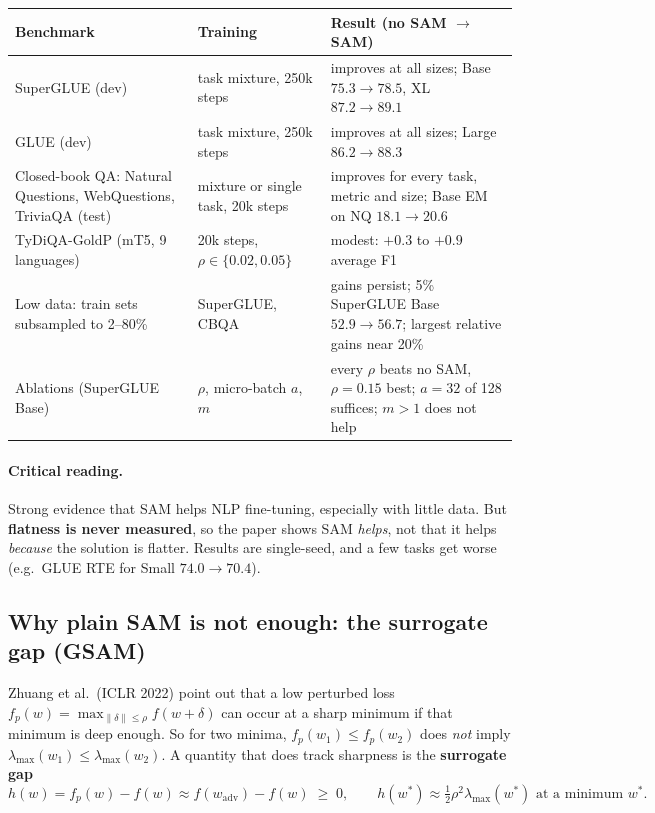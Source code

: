 \documentclass[11pt]{article}
\newcommand{\lmax}{\lambda_{\max}}
\theoremstyle{plain}
\begin{document}
\begin{center}\small
\begin{tabularx}{\textwidth}{@{}p{4.2cm}p{3.0cm}L@{}}
\toprule
\textbf{Benchmark} & \textbf{Training} & \textbf{Result (no SAM $\to$ SAM)} \\
\midrule
SuperGLUE (dev) & task mixture, 250k steps & improves at all sizes; Base $75.3\to78.5$, XL $87.2\to89.1$ \\
GLUE (dev) & task mixture, 250k steps & improves at all sizes; Large $86.2\to88.3$ \\
Closed-book QA: Natural Questions, WebQuestions, TriviaQA (test) & mixture or single task, 20k steps & improves for every task, metric and size; Base EM on NQ $18.1\to20.6$ \\
TyDiQA-GoldP (mT5, 9 languages) & 20k steps, $\rho \in \{0.02, 0.05\}$ & modest: $+0.3$ to $+0.9$ average F1 \\
Low data: train sets subsampled to 2--80\% & SuperGLUE, CBQA & gains persist; 5\% SuperGLUE Base $52.9\to56.7$; largest relative gains near 20\% \\
Ablations (SuperGLUE Base) & $\rho$, micro-batch $a$, $m$ & every $\rho$ beats no SAM, $\rho{=}0.15$ best; $a = 32$ of 128 suffices; $m>1$ does not help \\
\bottomrule
\end{tabularx}
\end{center}

\paragraph{Critical reading.} Strong evidence that SAM helps NLP fine-tuning, especially with little data. But \textbf{flatness is never measured},
so the paper shows SAM \emph{helps}, not that it helps \emph{because} the solution is flatter. Results are single-seed, and a few tasks get worse
(e.g.\ GLUE RTE for Small $74.0\to70.4$).

\subsection{Why plain SAM is not enough: the surrogate gap (GSAM)}

Zhuang et al.\ (ICLR 2022) point out that a low perturbed loss $f_p(w) = \max_{\|\delta\|\le\rho} f(w+\delta)$ can occur at a sharp minimum if that minimum is deep enough.
So for two minima, $f_p(w_1) \le f_p(w_2)$ does \emph{not} imply $\lmax(w_1) \le \lmax(w_2)$. A quantity that does track sharpness is the \textbf{surrogate gap}
\begin{equation}
  h(w) = f_p(w) - f(w) \approx f(w_{\mathrm{adv}}) - f(w) \;\ge\; 0, \qquad h(w^*) \approx \tfrac12\rho^2\lmax(w^*) \text{ at a minimum } w^*.
\end{equation}
\end{document}
